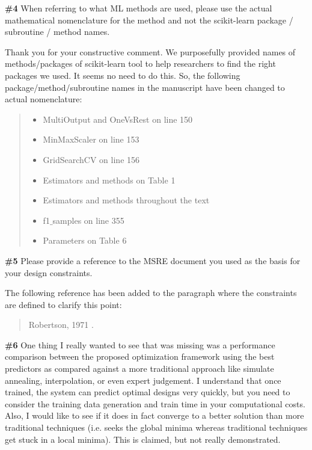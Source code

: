 \documentclass{ar2rc}
\begin{document}

    \Comment \textbf{\#4} When referring to what ML methods are used, please use the actual
    mathematical nomenclature for the method and not the scikit-learn package /
    subroutine / method names.

    \Response Thank you for your constructive comment. We purposefully provided
    names of methods/packages of scikit-learn tool to help researchers to find
    the right packages we used. It seems no need to do this. So, the following
    package/method/subroutine names in the manuscript have been changed to
    actual nomenclature:\\

    \begin{quote}
        \begin{itemize}
            \item MultiOutput and OneVsRest on line 150
            \item MinMaxScaler on line 153
            \item GridSearchCV on line 156
            \item Estimators and methods on Table 1
            \item Estimators and methods throughout the text
            \item f1$\_$samples on line 355
            \item Parameters on Table 6
        \end{itemize}
    \end{quote}


    \Comment \textbf{\#5} Please provide a reference to the MSRE document you used as the
    basis for your design constraints.

    \Response The following reference has been added to the paragraph where the constraints are defined to clarify this point:\\

    \begin{quote}
        Robertson, 1971 \cite{robertson1971}.
    \end{quote}


    \Comment \textbf{\#6} One thing I really wanted to see that was missing was a
    performance comparison between the proposed optimization framework using
    the best predictors as compared against a more traditional approach like
    simulate annealing, interpolation, or even expert judgement.  I understand
    that once trained, the system can predict optimal designs very quickly, but
    you need to consider the training data generation and train time in your
    computational costs.  Also, I would like to see if it does in fact converge
    to a better solution than more traditional techniques (i.e. seeks the
    global minima whereas traditional techniques get stuck in a local minima).
    This is claimed, but not really demonstrated.
\end{document}
